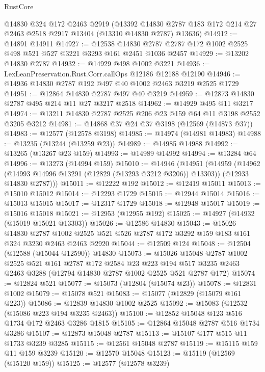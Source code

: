 \begin{lexlean}{RustCore}
\begin{coremodule}
    @14830
    @324
    @172
    @2463
    @2919
    (@13392 @14830 @2787 @183 @172 @214 @27 @2463 @2518 @2917 @13404 (@13310 @14830 @2787) @13636)
@14912 := @14891 @14911
@14927 := @12538
    @14830
    @2787
    @2787
    @172
    @1002
    @2525
    @498
    @521
    @527
    @3221
    @3293
    @161
    @2451
    @1036
    @2457
@14929 := @13202 @14830 @2787
@14932 := @14929 @498 @1002 @3221
@14936 := LexLeanPreservation.Rust.Corr.callOps @12186 @12188 @12190
@14946 := @14936 @14830 @2787 @192 @497 @40 @1002 @2463 @3219 @2525 @1729
@14951 := @12864 @14830 @2787 @497 @40 @3219
@14959 := @12873 @14830 @2787 @495 @214 @11 @27 @3217 @2518
@14962 := @14929 @495 @11 @3217
@14974 := @13211 @14830 @2787 @2525 @206 @23 @159 @64 @11 @3198 @2552 @3205 @3212
@14981 := @14868 @37 @24 @37 @3198 (@12569 (@14873 @37))
@14983 := @12577 (@12578 @3198)
@14985 := @14974 (@14981 @14983)
@14988 := @13235 (@13244 (@13259 @23))
@14989 := @14985 @14988
@14992 := @13265 (@13267 @23 @159)
@14993 := @14989 @14992
@14994 := @13284 @64
@14996 := @13273 (@14994 @159)
@15010 := @14946
    (@14951
      (@14959
        (@14962 (@14993 @14996 @13291 (@12829 (@13293 @3212 @3206)) @13303))
        (@12933 @14830 @2787)))
@15011 := @12222 @192
@15012 := @12419 @15011
@15013 := @15010 @15012
@15014 := @12293 @1729
@15015 := @12944 @15014
@15016 := @15013 @15015
@15017 := @12317 @1729
@15018 := @12948 @15017
@15019 := @15016 @15018
@15021 := @12953 (@12955 @192)
@15025 := @14927 (@14932 (@15019 @15021 @13303))
@15026 := @12586 @14830
@15043 := @15026
    @14830
    @2787
    @1002
    @2525
    @521
    @526
    @2787
    @172
    @3292
    @159
    @183
    @161
    @324
    @3230
    @2463
    @2463
    @2920
@15044 := @12509 @124
@15048 := @12504 (@12588 (@15044 @12590)) @14830
@15073 := @15026
    @15048
    @2787
    @1002
    @2525
    @521
    @161
    @2787
    @172
    @2584
    @23
    @223
    @194
    @517
    @3235
    @2463
    @2463
    @3288
    (@12794 @14830 @2787 @1002 @2525 @521 @2787 @172)
@15074 := @12824 @521
@15077 := @15073 (@12804 (@15074 @23))
@15078 := @12831 @1002
@15079 := @15078 @521
@15083 := @15077 (@12829 (@15079 @161 @223))
@15086 := @12839 @14830 @1002 @2525
@15092 := @15083 (@12532 (@15086 @223 @194 @3235 @2463))
@15100 := @12852 @15048 @123 @516 @1734 @172 @2463 @3286 @1815
@15105 := @12864 @15048 @2787 @516 @1734 @3286
@15107 := @12873 @15048 @2787
@15113 := @15107 @177 @515 @11 @1733 @3239 @3285
@15115 := @12561 @15048 @2787
@15119 := @15115 @159 @11 @159 @3239
@15120 := @12570 @15048
@15123 := @15119 (@12569 (@15120 @159))
@15125 := @12577 (@12578 @3239)

\end{coremodule}
\end{lexlean}
